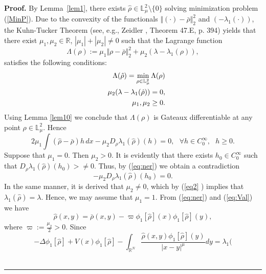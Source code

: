 \documentclass[12pt,thmsa]{article}
\newenvironment{proof}[1][Proof]{\noindent\textbf{#1.} }{\ \rule{0.5em}{0.5em}}
\begin{document}
\begin{proof}
By Lemma~\ref{lem1}, there exists $\hat{\rho}\in \mathbb{L}_{\mu
}^{2}\setminus \{0\}$ solving minimization problem (\ref{MinP}). Due to the
convexity of the functionals $\Vert (\cdot )-\bar{\rho}\Vert _{2}^{2}$ and $%
(-\lambda _{1}(\cdot ))$, the Kuhn-Tucker Theorem (see, e.g., Zeidler \cite%
{Zeidler}, Theorem 47.E, p. 394) yields that there exist $\mu _{1},\mu
_{2}\in \mathbb{R}$, $|\mu _{1}|+|\mu _{2}|\neq 0$ such that the Lagrange
function
\begin{equation*}
\Lambda (\rho ):=\mu _{1}\Vert \rho -\bar{\rho}\Vert _{2}^{2}+\mu
_{2}(\lambda -\lambda _{1}(\rho )),
\end{equation*}%
satisfies the following conditions:
\begin{eqnarray}
&&\Lambda (\hat{\rho})=\min_{\rho \in \mathbb{L}_{\mu }^{2}}\Lambda (\rho )
\label{eq1} \notag\\
&&\mu _{2}(\lambda -\lambda _{1}(\hat{\rho}))=0,  \label{eq2} \\
&&\mu _{1},\mu _{2}\geq 0. \notag 
\end{eqnarray}%
Using Lemma \ref{lem10} we conclude that $\Lambda (\rho )$ is Gateaux
differentiable at any point $\rho \in \mathbb{L}_{\mu }^{2}$. Hence
\begin{equation}
2\mu _{1}\int (\hat{\rho}-\bar{\rho})h\,dx-\mu _{2}D_{\rho }\lambda _{1}(%
\hat{\rho})(h)=0,\text{ }\forall h\in C_{0}^{\infty },\text{ }h\geq 0.
\label{eq:ner}
\end{equation}%
Suppose that $\mu _{1}=0$. Then $\mu _{2}>0$. It is evidently that there
exists $h_{0}\in C_{0}^{\infty }$ such that $D_{\rho }\lambda _{1}(\hat{\rho}%
)(h_{0})>\neq 0$. Thus, by (\ref{eq:ner}) we obtain a contradiction
\begin{equation*}
-\mu _{2}D_{\rho }\lambda _{1}(\hat{\rho})(h_{0})=0.
\end{equation*}%
In the same manner, it is derived that $\mu _{2}\neq 0$, which by (\ref{eq2}%
) implies that $\lambda _{1}(\hat{\rho})=\lambda $. Hence, we may assume
that $\mu _{1}=1$. From (\ref{eq:ner}) and (\ref{eq:Val}) we have
\begin{equation}
\hat{\rho}(x,y)=\bar{\rho}(x,y)-\varpi \phi _{1}[\hat{\rho}](x)\phi _{1}[%
\hat{\rho}](y),  \label{eq:rhrho}
\end{equation}%
where $\varpi :=\frac{\mu _{2}}{2}>0$. Since
\begin{equation*}
-\Delta \phi _{1}[\hat{\rho}]+V(x)\phi _{1}[\hat{\rho}]-\int_{\mathbb{R}^{N}}%
\frac{\hat{\rho}(x,y)\phi _{1}[\hat{\rho}](y)}{|x-y|^{\mu }}dy=\lambda _{1}(%

\end{equation*}
\end{proof}
\end{document}
